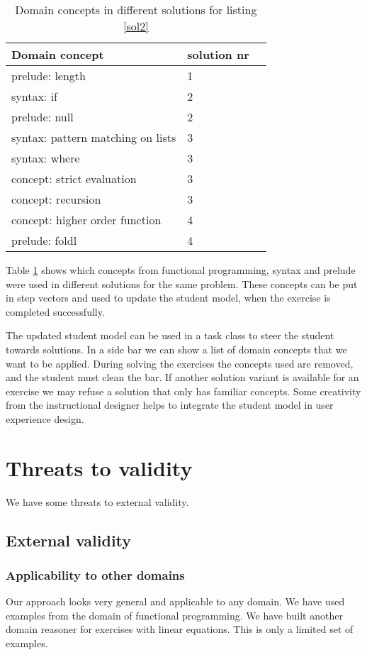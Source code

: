 \begin{table}[H]
\begin{tabular}{| l | l | l |}
\hline
Domain concept & solution nr\\
\hline
prelude: length &  1\\
\hline
syntax: if &  2\\
prelude: null &  2\\
\hline
syntax: pattern matching on lists &  3\\
syntax: where &  3\\
concept: strict evaluation & 3\\
concept: recursion &  3\\
\hline
concept: higher order function  &  4\\
prelude: foldl &  4\\
\hline
\end{tabular}
\caption{Domain concepts in different solutions for listing  \ref{sol2}}
\label{table.cls3}
\end{table}

Table \ref{table.cls3} shows which concepts from functional programming, syntax and prelude were used in different
solutions for the same problem.
These concepts can be put in step vectors and used to update the student model, when the exercise is completed successfully.

The updated student model can be used in a task class to steer the student towards solutions.
In a side bar we can show a list of domain concepts that we want to be  applied.
During solving the exercises the concepts used are removed, and the student must clean the bar. 
If another solution variant is available for an exercise we may refuse a solution that only has familiar concepts.
Some creativity from the instructional designer helps to integrate the student model in user experience design.



\section{Threats to validity}

We have some threats to external validity.


\subsection{External validity}

\subsubsection{Applicability to other domains}
Our approach looks very general and applicable to any domain.
We have used examples from the domain of functional programming.
We have built another domain reasoner for exercises with linear equations.
This is only a limited set of examples.

